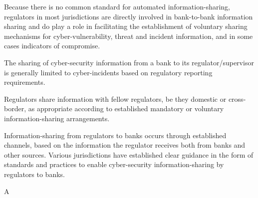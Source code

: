 \documentclass{article}
\begin{document}
\begin{choices}
    \item Because there is no common standard for automated information-sharing, regulators in most jurisdictions are directly involved in bank-to-bank information sharing and do play a role in facilitating the establishment of voluntary sharing mechanisms for cyber-vulnerability, threat and incident information, and in some cases indicators of compromise.
    \item The sharing of cyber-security information from a bank to its regulator/supervisor is generally limited to cyber-incidents based on regulatory reporting requirements.
    \item Regulators share information with fellow regulators, be they domestic or cross-border, as appropriate according to established mandatory or voluntary information-sharing arrangements.
    \item Information-sharing from regulators to banks occurs through established channels, based on the information the regulator receives both from banks and other sources. Various jurisdictions have established clear guidance in the form of standards and practices to enable cyber-security information-sharing by regulators to banks.
\end{choices}

\begin{correctanswer}
    A
\end{correctanswer}
\end{document}
